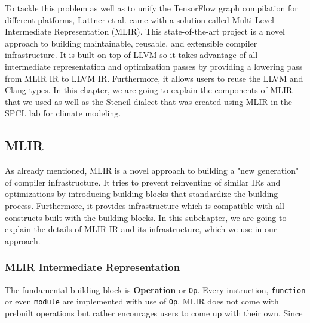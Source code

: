 \documentclass[sigplan,\review anonymous]{acmart}
\begin{document}
To tackle this problem as well as to unify the TensorFlow graph compilation
for different platforms, Lattner et al. \cite{lattner2020mlir} came with
a solution called Multi-Level Intermediate Representation (MLIR). This
state-of-the-art project is a novel approach to building maintainable,
reusable, and extensible compiler infrastructure. It is built on top of
LLVM so it takes advantage of all intermediate representation and
optimization passes by providing a lowering pass from MLIR IR to LLVM IR.
Furthermore, it allows users to reuse the LLVM and Clang types.
In this chapter, we are going to explain the components of MLIR that we
used as well as the Stencil dialect that was created using MLIR in the SPCL
lab for climate modeling.

\subsection{MLIR}
As already mentioned, MLIR is a novel approach to building a "new generation"
of compiler infrastructure. It tries to prevent reinventing of similar IRs
and optimizations by introducing building blocks that standardize the building
process. Furthermore, it provides infrastructure which is compatible with
all constructs built with the building blocks. In this subchapter, we are
going to explain the details of MLIR IR and its infrastructure, which we
use in our approach.

\subsubsection {MLIR Intermediate Representation}

The fundamental building block is \textbf{Operation} or \texttt{Op}. Every
instruction, \texttt{function} or even \texttt{module} are implemented with
use of \texttt{Op}. MLIR does not come with prebuilt operations but rather
encourages users to come up with their own. Since
\end{document}
